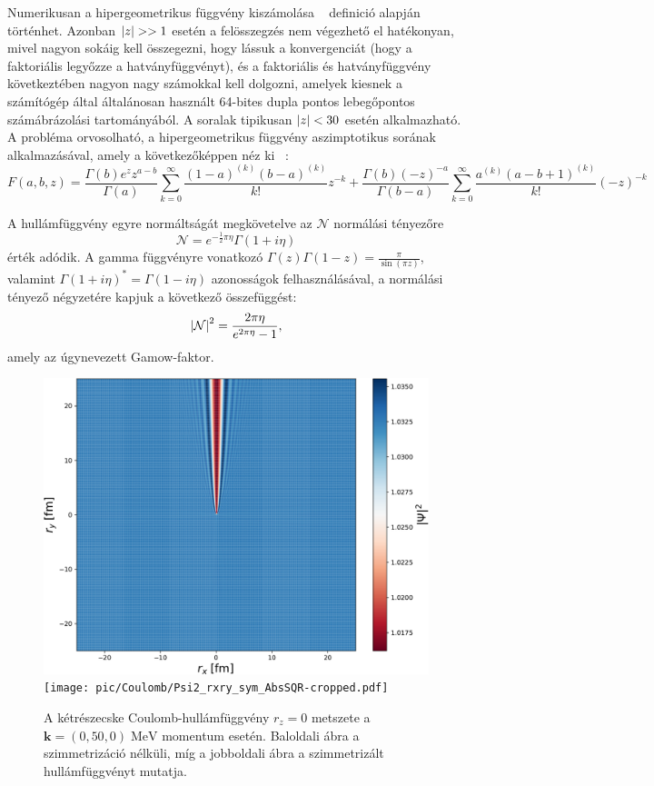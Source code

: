 \documentclass[11pt,a4paper]{article}
\numberwithin{equation}{subsection}
\numberwithin{figure}{section}
\begin{document}
Numerikusan a hipergeometrikus függvény kiszámolása ~ definició alapján történhet. Azonban $\abs{z}>>1$ esetén a felösszegzés nem végezhető el hatékonyan, mivel nagyon sokáig kell összegezni, hogy lássuk a konvergenciát (hogy a faktoriális legyőzze a hatványfüggvényt), és a faktoriális és hatványfüggvény következtében nagyon nagy számokkal kell dolgozni, amelyek kiesnek a számítógép által általánosan használt 64-bites dupla pontos lebegőpontos számábrázolási tartományából. A soralak tipikusan $\abs{z}<30$ esetén alkalmazható. A probléma orvosolható, a hipergeometrikus függvény aszimptotikus sorának alkalmazásával, amely a következőképpen néz ki ~\cite{NIST:DLMF}:
\begin{equation}
F(a,b,z)=\frac{\Gamma(b)e^zz^{a-b}}{\Gamma(a)}\sum_{k=0}^{\infty}\frac{(1-a)^{(k)}(b-a)^{(k)}}{k!}z^{-k}+\frac{\Gamma(b)(-z)^{-a}}{\Gamma(b-a)}\sum_{k=0}^\infty \frac{a^{(k)}(a-b+1)^{(k)}}{k!}(-z)^{-k}
\end{equation}

A hullámfüggvény egyre normáltságát megkövetelve az $\mathcal{N}$ normálási tényezőre 
\begin{equation}
\mathcal{N}=e^{-\frac{1}{2}\pi\eta}\Gamma(1+i\eta)
\end{equation}
érték adódik. A gamma függvényre vonatkozó $\Gamma(z)\Gamma(1-z)=\frac{\pi}{\sin(\pi z)}$, valamint $\Gamma(1+i\eta)^{*}=\Gamma(1-i\eta)$ azonosságok felhasználásával, a normálási tényező négyzetére kapjuk a következő összefüggést:
\begin{equation}
\abs{\mathcal{N}}^2=\frac{2\pi\eta}{e^{2\pi\eta}-1},
\label{eq:Gamow}
\end{equation}
amely az úgynevezett Gamow-faktor.


\begin{figure}[H]
\centering
\includegraphics[scale=0.35]{pic/Coulomb/Psi2_rxry_nosym_AbsSQR-cropped.pdf}
\texttt{[image: pic/Coulomb/Psi2\_rxry\_sym\_AbsSQR-cropped.pdf]}
\caption{A kétrészecske Coulomb-hullámfüggvény $r_z=0$ metszete a $\bm{k}=(0,50,0)\;\mathrm{MeV}$ momentum esetén. Baloldali ábra a szimmetrizáció nélküli, míg a jobboldali ábra a szimmetrizált  hullámfüggvényt mutatja. }
\end{figure}
\end{document}
